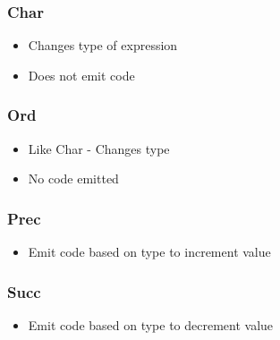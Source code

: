 \documentclass[usepdftitle=false,professionalfonts,compress ]{beamer}
\begin{document}
{
\begin{frame}\frametitle{Char}

	\begin{itemize}
	\item Changes type of expression
			\item Does not emit code
				\end{itemize}

\end{frame}}




{
\begin{frame}\frametitle{Ord}

	\begin{itemize}
	\item Like Char - Changes type
			\item No code emitted
				\end{itemize}

\end{frame}}




{
\begin{frame}\frametitle{Prec}

	\begin{itemize}
	\item Emit code based on type to increment value
				\end{itemize}

\end{frame}}



{
\begin{frame}\frametitle{Succ}

	\begin{itemize}
	\item Emit code based on type to decrement value
				\end{itemize}

\end{frame}}
\end{document}
